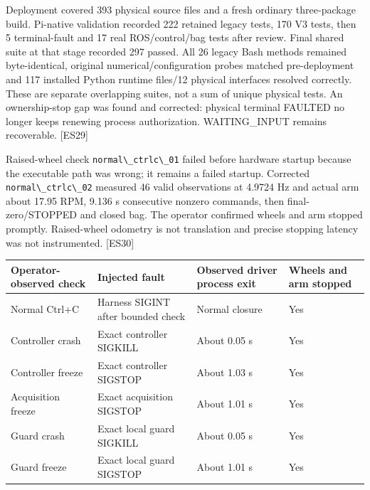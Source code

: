 \documentclass[
  10pt,
  letterpaper,
]{article}
\newcommand{\passthrough}[1]{#1}
\newcounter{none} %
\begin{document}
Deployment covered 393 physical source files and a fresh ordinary
three-package build. Pi-native validation recorded 222 retained legacy
tests, 170 V3 tests, then 5 terminal-fault and 17 real ROS/control/bag
tests after review. Final shared suite at that stage recorded 297
passed. All 26 legacy Bash methods remained byte-identical, original
numerical/configuration probes matched pre-deployment and 117 installed
Python runtime files/12 physical interfaces resolved correctly. These
are separate overlapping suites, not a sum of unique physical tests. An
ownership-stop gap was found and corrected: physical terminal FAULTED no
longer keeps renewing process authorization. WAITING\_INPUT remains
recoverable. {[}ES29{]}

Raised-wheel check \passthrough{\lstinline!normal\_ctrlc\_01!} failed
before hardware startup because the executable path was wrong; it
remains a failed startup. Corrected
\passthrough{\lstinline!normal\_ctrlc\_02!} measured 46 valid
observations at 4.9724 Hz and actual arm about 17.95 RPM, 9.136 s
consecutive nonzero commands, then final-zero/STOPPED and closed bag.
The operator confirmed wheels and arm stopped promptly. Raised-wheel
odometry is not translation and precise stopping latency was not
instrumented. {[}ES30{]}

{\def\LTcaptype{none} %
\begin{longtable}[]{@{}
  >{\raggedright\arraybackslash}p{}
  >{\raggedright\arraybackslash}p{}
  >{\raggedleft\arraybackslash}p{}
  >{\raggedright\arraybackslash}p{}@{}}
\toprule\noalign{}
\begin{minipage}[b]{\linewidth}\raggedright
Operator-observed check
\end{minipage} & \begin{minipage}[b]{\linewidth}\raggedright
Injected fault
\end{minipage} & \begin{minipage}[b]{\linewidth}\raggedleft
Observed driver process exit
\end{minipage} & \begin{minipage}[b]{\linewidth}\raggedright
Wheels and arm stopped
\end{minipage} \\
\midrule\noalign{}
\endhead
\bottomrule\noalign{}
\endlastfoot
Normal Ctrl+C & Harness SIGINT after bounded check & Normal closure &
Yes \\
Controller crash & Exact controller SIGKILL & About 0.05 s & Yes \\
Controller freeze & Exact controller SIGSTOP & About 1.03 s & Yes \\
Acquisition freeze & Exact acquisition SIGSTOP & About 1.01 s & Yes \\
Guard crash & Exact local guard SIGKILL & About 0.05 s & Yes \\
Guard freeze & Exact local guard SIGSTOP & About 1.01 s & Yes \\
\end{longtable}
}
\end{document}
